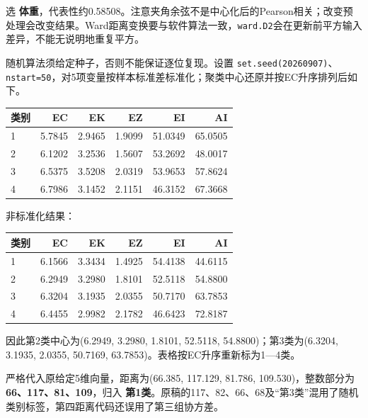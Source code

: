 选 \textbf{体重}，代表性约0.58508。注意夹角余弦不是中心化后的Pearson相关；改变预处理会改变结果。Ward距离变换要与软件算法一致，\texttt{ward.D2}会在更新前平方输入差异，不能无说明地重复平方。



随机算法须给定种子，否则不能保证逐位复现。设置 \texttt{set.seed(20260907)}、\texttt{nstart=50}，对5项变量按样本标准差标准化；聚类中心还原并按EC升序排列后如下。

\begin{center}\small\setlength{\tabcolsep}{4pt}\renewcommand{\arraystretch}{1.18}\begin{tabular}{@{}lrrrrr@{}}
\toprule
类别 & EC & EK & EZ & EI & AI \\
\midrule

1 & 5.7845 & 2.9465 & 1.9099 & 51.0349 & 65.0505 \\
2 & 6.1202 & 3.2536 & 1.5607 & 53.2692 & 48.0017 \\
3 & 6.5375 & 3.5208 & 2.0319 & 53.9653 & 57.8624 \\
4 & 6.7986 & 3.1452 & 2.1151 & 46.3152 & 67.3668 \\
\bottomrule\end{tabular}\end{center}

非标准化结果：

\begin{center}\small\setlength{\tabcolsep}{4pt}\renewcommand{\arraystretch}{1.18}\begin{tabular}{@{}lrrrrr@{}}
\toprule
类别 & EC & EK & EZ & EI & AI \\
\midrule

1 & 6.1566 & 3.3434 & 1.4925 & 54.4138 & 44.6115 \\
2 & 6.2949 & 3.2980 & 1.8101 & 52.5118 & 54.8800 \\
3 & 6.3204 & 3.1935 & 2.0355 & 50.7170 & 63.7853 \\
4 & 6.4455 & 2.9982 & 2.1782 & 46.6423 & 72.8187 \\
\bottomrule\end{tabular}\end{center}

因此第2类中心为(6.2949, 3.2980, 1.8101, 52.5118, 54.8800)；第3类为(6.3204, 3.1935, 2.0355, 50.7169, 63.7853)。表格按EC升序重新标为1---4类。

严格代入原给定5维向量，距离为(66.385, 117.129, 81.786, 109.530)，整数部分为 \textbf{66、117、81、109}，归入 \textbf{第1类}。原稿的117、82、66、68及``第3类''混用了随机类别标签，第四距离代码还误用了第三组协方差。

